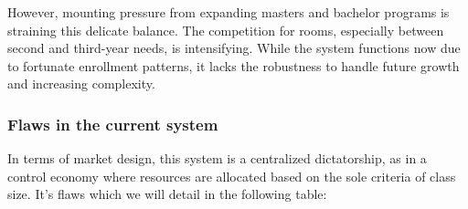 \documentclass[a4paper, oneside]{article}
\theoremstyle{plain}
\begin{document}
However, mounting pressure from expanding masters and bachelor programs is straining this delicate balance. The competition for rooms,
especially between second and third-year needs, is intensifying. While the system functions now due to fortunate enrollment patterns,
it lacks the robustness to handle future growth and increasing complexity.

\subsubsection{Flaws in the current system}
In terms of market design, this system is a centralized dictatorship, as in a control economy where resources are allocated based on the sole criteria of class size. It's flaws which we will detail in the following table:\\
\end{document}
